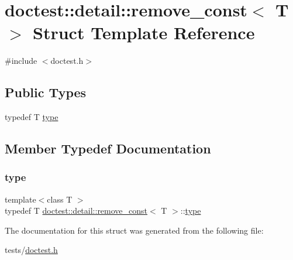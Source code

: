 \hypertarget{structdoctest_1_1detail_1_1remove__const}{}\section{doctest\+:\+:detail\+:\+:remove\+\_\+const$<$ T $>$ Struct Template Reference}
\label{structdoctest_1_1detail_1_1remove__const}


{\ttfamily \#include $<$doctest.\+h$>$}

\subsection*{Public Types}
\begin{DoxyCompactItemize}
\item 
typedef T \hyperlink{structdoctest_1_1detail_1_1remove__const_ad6a97a5d2fcb5f513bbff8ea12e280f8}{type}
\end{DoxyCompactItemize}


\subsection{Member Typedef Documentation}
\mbox{\label{structdoctest_1_1detail_1_1remove__const_ad6a97a5d2fcb5f513bbff8ea12e280f8}} 
\subsubsection{\texorpdfstring{type}{type}}
{\footnotesize\ttfamily template$<$class T $>$ \\
typedef T \hyperlink{structdoctest_1_1detail_1_1remove__const}{doctest\+::detail\+::remove\+\_\+const}$<$ T $>$\+::\hyperlink{structdoctest_1_1detail_1_1remove__const_ad6a97a5d2fcb5f513bbff8ea12e280f8}{type}}



The documentation for this struct was generated from the following file\+:\begin{DoxyCompactItemize}
\item 
tests/\hyperlink{doctest_8h}{doctest.\+h}\end{DoxyCompactItemize}
